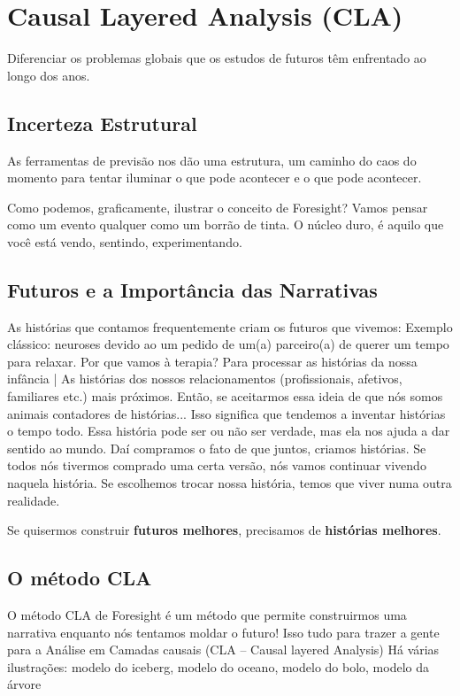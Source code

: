 \pagebreak
\section{Causal Layered Analysis (CLA)}

\begin{slidecontent}
Diferenciar os problemas globais que os estudos de futuros têm enfrentado ao longo dos anos.
\end{slidecontent}


\subsection{Incerteza Estrutural}
As ferramentas de previsão nos dão uma estrutura, um caminho do caos do momento para tentar iluminar o que pode acontecer e o que pode acontecer.

Como podemos, graficamente, ilustrar o conceito de Foresight?
Vamos pensar como um evento qualquer como um borrão de tinta.
O núcleo duro, é aquilo que você está vendo, sentindo, experimentando.

\subsection{Futuros e a Importância das Narrativas}
As histórias que contamos frequentemente criam os futuros que vivemos: 
Exemplo clássico: neuroses devido ao um pedido de um(a) parceiro(a) de querer um tempo para relaxar. 
Por que vamos à terapia? 
Para processar as histórias da nossa infância | As histórias dos nossos relacionamentos (profissionais, afetivos, familiares etc.) mais próximos. 
Então, se aceitarmos essa ideia de que nós somos animais contadores de histórias...
Isso significa que tendemos a inventar histórias o tempo todo. 
Essa história pode ser ou não ser verdade, mas ela nos ajuda a dar sentido ao mundo. 
Daí compramos o fato de que juntos, criamos histórias. Se todos nós tivermos comprado uma certa versão, nós vamos continuar vivendo naquela história.
Se escolhemos trocar nossa história, temos que viver numa outra realidade.

\begin{keypoint}
Se quisermos construir \textbf{futuros melhores}, precisamos de \textbf{histórias melhores}.
\end{keypoint}

\subsection{O método CLA}
O método CLA de Foresight é um método que permite construirmos uma narrativa enquanto nós tentamos moldar o futuro!
Isso tudo para trazer a gente para a Análise em Camadas causais (CLA – Causal layered Analysis)
Há várias ilustrações: modelo do iceberg, modelo do oceano, modelo do bolo, modelo da árvore

